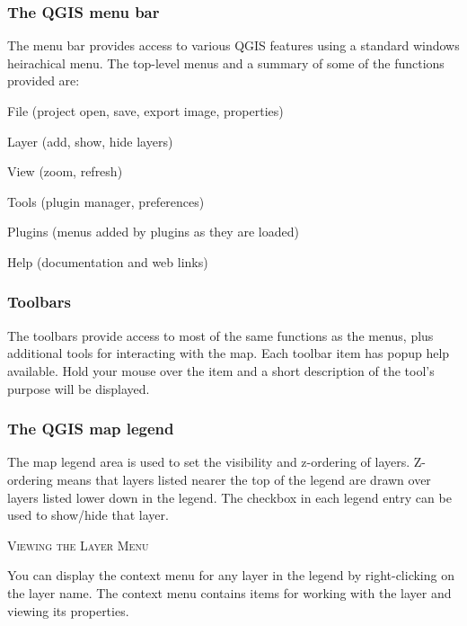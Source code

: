 \documentclass[10pt,english]{article}
\newcommand\qgistip[1]{\raggedright\small{#1}}
\begin{document}
\begin{onehalfspace}
\subsubsection{The QGIS menu bar}
The menu bar provides access to various QGIS features using a standard windows
heirachical menu. The top-level menus and a summary of some of the functions provided are:
\begin{compactitem}
\item File (project open, save, export image, properties)
\item Layer (add, show, hide layers)
\item View (zoom, refresh)
\item Tools (plugin manager, preferences)
\item Plugins (menus added by plugins as they are loaded)
\item Help (documentation and web links)
\end{compactitem}

\subsubsection{Toolbars}
The toolbars provide access to most of the same functions as the menus, plus
additional tools for interacting with the map. Each toolbar item has popup
help available. Hold your mouse over the item and a short description of the
tool's purpose will be displayed. %

\subsubsection{The QGIS map legend}
The map legend area is used to set the visibility and z-ordering of layers.
Z-ordering means that layers listed nearer the top of the legend are drawn
over layers listed lower down in the legend. The checkbox in each legend entry
can be used to show/hide that layer.
\begin{Tip} \caption{\textsc{Viewing the Layer Menu}}
\qgistip{You can display the context menu for any layer in the legend by right-clicking
on the layer name. The context menu contains items for working with the layer and viewing
its properties.}
\end{Tip}


\end{onehalfspace}
\end{document}
